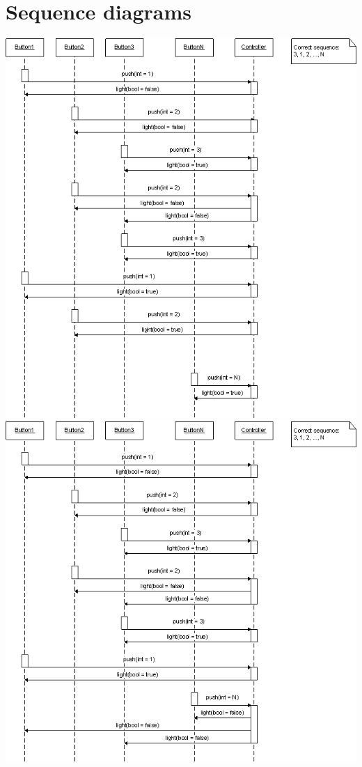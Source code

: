 \documentclass{article}
\begin{document}
\section{Sequence diagrams}
\begin{center}
  \includegraphics[width=\linewidth]{../sequence_scenario1}
  \includegraphics[width=\linewidth]{../sequence_scenario2}

\end{center}
\end{document}
